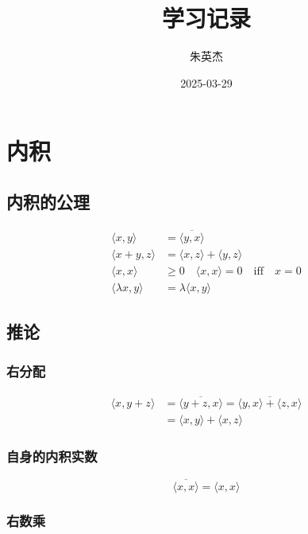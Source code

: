 \documentclass[12pt,a4paper]{ctexart}
\title{学习记录}
\author{朱英杰}
\date{2025-03-29}
\begin{document}
\maketitle
\tableofcontents

\section{内积}

\subsection{内积的公理}

\begin{align*}
    \langle x, y\rangle &= \overline{\langle y, x\rangle} \\
    \langle x+y , z \rangle &= \langle x, z\rangle + \langle y, z\rangle \\
    \langle x, x \rangle & \ge 0 \quad \langle x, x \rangle = 0\quad \text{iff} \quad x = 0 \\
    \langle \lambda x, y\rangle &= \lambda \langle x,y \rangle
\end{align*}

\subsection{推论}

\subsubsection{右分配}

\begin{align*}
    \langle x, y+z \rangle  &= \overline{\langle y+z, x \rangle} = \overline{\langle y,x \rangle + \langle z, x\rangle} \\
    &= \langle x,y \rangle + \langle x,z \rangle
\end{align*}

\subsubsection{自身的内积实数}

\[
\overline{ \langle x,x\rangle}= \langle x,x \rangle
\]

\subsubsection{右数乘}
\end{document}
